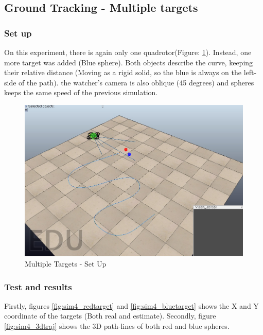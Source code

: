 \subsection{Ground Tracking - Multiple targets}
\subsubsection{Set up}
 On this experiment, there is again only one quadrotor(Figure: \ref{fig:sim4_set_up}). Instead, one more target was added (Blue sphere). Both objects describe the curve, keeping their relative distance (Moving as a rigid solid, so the blue is always on the left-side of the path). the watcher's camera is also oblique (45 degrees) and spheres keeps the same speed of the previous simulation.
 
\begin{figure}[ht]
	\centering
	\includegraphics[width=0.7\linewidth]{../Images/c3/sim4_set_up}
	\caption{Multiple Targets - Set Up}
	\label{fig:sim4_set_up}
\end{figure}

\subsubsection{Test and results}

	Firstly, figures \ref{fig:sim4_redtarget} and \ref{fig:sim4_bluetarget} shows the X and Y coordinate of the targets (Both real and estimate). Secondly, figure \ref{fig:sim4_3dtraj} shows the 3D path-lines of both red and blue spheres. \\
	
